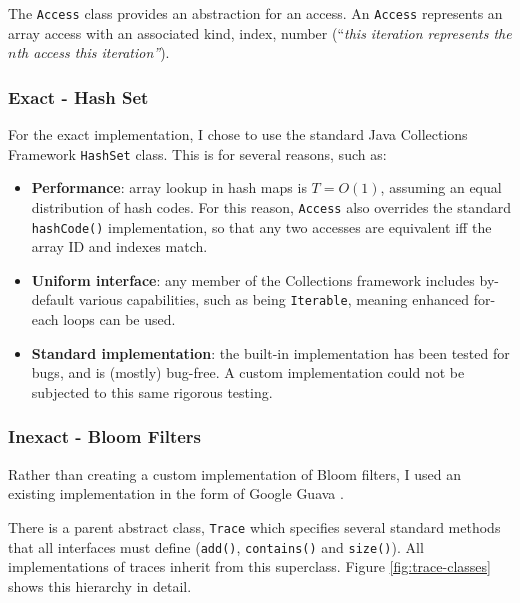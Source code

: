 	The \texttt{Access} class provides an abstraction for an access. An \texttt{Access} represents an array access with an associated kind, index, number (``\textit{this iteration represents the $n$th access this iteration''}).
	
		\subsubsection{Exact - Hash Set} \label{sec:runtime/implementation/trace/hashset}
		For the exact implementation, I chose to use the standard Java Collections Framework \texttt{HashSet} class. This is for several reasons, such as:
		
		\begin{itemize}
			\item \textbf{Performance}: array lookup in hash maps is $T=O(1)$, assuming an equal distribution of hash codes. For this reason, \texttt{Access} also overrides the standard \texttt{hashCode()} implementation, so that any two accesses are equivalent iff the array ID and indexes match.
			
			\item \textbf{Uniform interface}: any member of the Collections framework includes by-default various capabilities, such as being \texttt{Iterable}, meaning enhanced for-each loops can be used.
			
			\item \textbf{Standard implementation}: the built-in implementation has been tested for bugs, and is (mostly) bug-free. A custom implementation could not be subjected to this same rigorous testing.
		\end{itemize}
		
		\subsubsection{Inexact - Bloom Filters} \label{sec:runtime/implementation/trace/bloom}
			Rather than creating a custom implementation of Bloom filters, I used an existing implementation in the form of Google Guava \citep{GuavaBloomFilter}.\
		
		There is a parent abstract class, \texttt{Trace} which specifies several standard methods that all interfaces must define (\texttt{add()}, \texttt{contains()} and \texttt{size()}). All implementations of traces inherit from this superclass. Figure \ref{fig:trace-classes} shows this hierarchy in detail.
		
